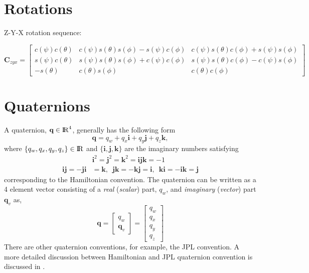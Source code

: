 \documentclass{article}
\renewcommand{\Vec}[1]{{\mathbf{#1}}}
\newcommand{\Mat}[1]{{\mathbf{#1}}}
\newcommand{\real}{{\rm I\!R}}
\newcommand{\quat}{{\Vec{q}}}
\newcommand{\rot}{{\Mat{C}}}
\begin{document}
\newpage
\section{Rotations}

Z-Y-X rotation sequence:

\begin{equation}
  \rot_{zyx} =
  \begin{bmatrix}
    c(\psi) c(\theta)
    & c(\psi) s(\theta) s(\phi) - s(\psi) c(\phi)
    & c(\psi) s(\theta) c(\phi) + s(\psi) s(\phi) \\
    s(\psi) c(\theta)
    & s(\psi) s(\theta) s(\phi) + c(\psi) c(\phi)
    & s(\psi) s(\theta) c(\phi) - c(\psi) s(\phi) \\
    -s(\theta) & c(\theta) s(\phi) & c(\theta) c(\phi)
  \end{bmatrix}
\end{equation}



\newpage
\section{Quaternions}

A quaternion, $\Vec{q} \in \real^{4}$, generally has the following form
%
\begin{equation}
  \quat = q_{w} + q_{x} \mathbf{i} + q_{y} \mathbf{j} + q_{z} \mathbf{k},
\end{equation}
%
where $\{ q_{w}, q_{x}, q_{y}, q_{z} \} \in \real$ and $\{ \mathbf{i}, \mathbf{j},
\mathbf{k} \}$ are the imaginary numbers satisfying
%
\begin{equation}
\begin{split}
  &\mathbf{i}^{2}
  = \mathbf{j}^{2}
  = \mathbf{k}^{2}
  = \mathbf{ijk}
  = -1 \\
  \mathbf{ij} = -\mathbf{ji} &= \mathbf{k}, \enspace
  \mathbf{jk} = -\mathbf{kj} = \mathbf{i}, \enspace
  \mathbf{ki} = -\mathbf{ik} = \mathbf{j}
\end{split}
\end{equation}
%
corresponding to the Hamiltonian convention. The quaternion can be written as a
4 element vector consisting of a \textit{real} (\textit{scalar}) part, $q_{w}$,
and \textit{imaginary} (\textit{vector}) part $\quat_{v}$ as,
%
\begin{equation}
  \quat =
  \begin{bmatrix} q_{w} \\ \quat_{v} \end{bmatrix} =
  \begin{bmatrix} q_{w} \\ q_{x} \\ q_{y} \\ q_{z} \end{bmatrix}
\end{equation}
%
There are other quaternion conventions, for example, the JPL convention. A more
detailed discussion between Hamiltonian and JPL quaternion convention is
discussed in \cite{Sola2017}.
\end{document}
